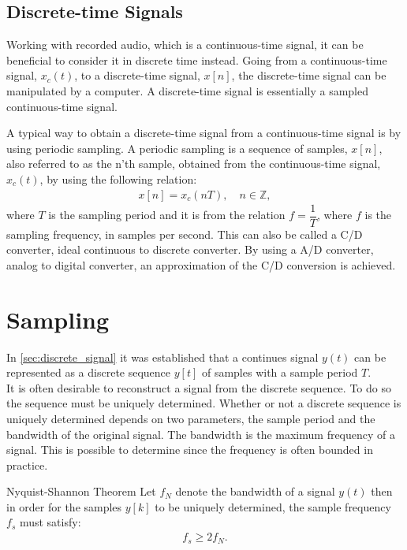 \subsection*{Discrete-time Signals} 
Working with recorded audio, which is a continuous-time signal, it can be beneficial to consider it in discrete time instead.
Going from a continuous-time signal, $x_c(t)$, to a discrete-time signal, $x[n]$, the discrete-time signal can be manipulated by a computer. A discrete-time signal is essentially a sampled continuous-time signal.

A typical way to obtain a discrete-time signal from a continuous-time signal is by using periodic sampling. A periodic sampling is a sequence of samples, $x[n]$, also referred to as the n'th sample, obtained from the continuous-time signal, $x_c(t)$, by using the following relation:
\begin{align*}
x[n]=x_c (nT), \quad   n \in \mathbb{Z},
\end{align*}
where $T$ is the sampling period and it is from the relation $f=\dfrac{1}{T}$, where $f$ is the sampling frequency, in samples per second. This can also be called a C/D converter, ideal continuous to discrete converter. 
By using a A/D converter, analog to digital converter, an approximation of the C/D conversion is achieved. \cite[p. 140-142]{DiscreteTimeSignal}\\

\section{Sampling}



In \autoref{sec:discrete_signal} it was established that a continues signal $y(t)$ can be represented as a discrete sequence $y[t]$ of samples with a sample period $T$.\\
It is often desirable to reconstruct a signal from the discrete sequence. To do so the sequence must be uniquely determined. Whether or not a discrete sequence is uniquely determined depends on two parameters, the sample period and the bandwidth of the original signal. The bandwidth is the maximum frequency of a signal. This is possible to determine since the frequency is often bounded in practice.   

\begin{theorem}{Nyquist-Shannon Theorem}
    \label{the:Nyquist-Shannon}
    Let $f_N$ denote the bandwidth of a signal $y(t)$ then in order for the samples $y[k]$ to be uniquely determined, the sample frequency $f_s$ must satisfy:
    \begin{align*}
        f_s \geq 2f_N.
    \end{align*}
    \cite[397]{mandal2007continuous}
\end{theorem}

